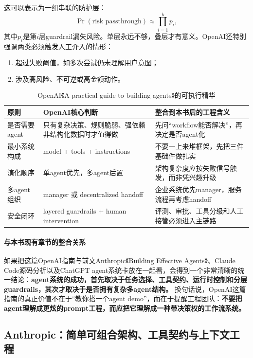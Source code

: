 \documentclass[12pt,a4paper]{article}
\begin{document}
这可以表示为一组串联的防护层：
\begin{equation}
\Pr(\text{risk passthrough}) \approx \prod_{i=1}^{k} p_i,
\end{equation}
其中$p_i$是第$i$层guardrail漏失风险。单层永远不够，叠层才有意义。OpenAI还特别强调两类必须触发人工介入的情形：
\begin{enumerate}
    \item 超过失败阈值，如多次尝试仍未理解用户意图；
    \item 涉及高风险、不可逆或高金额动作。
\end{enumerate}

\begin{table}[H]
\centering
\caption{OpenAI《A practical guide to building agents》的可执行精华}
\begin{tabular}{p{3.1cm}p{4.6cm}p{4.7cm}}
\toprule
\textbf{原则} & \textbf{OpenAI核心判断} & \textbf{整合到本书后的工程含义} \\
\midrule
是否需要agent & 只有复杂决策、规则脆弱、强依赖非结构化数据时才值得做 & 先问“workflow能否解决”，再决定是否agent化 \\
最小系统构成 & model + tools + instructions & 不要一上来堆框架，先把三件基础件做扎实 \\
演化顺序 & 单agent优先，多agent后置 & 架构复杂度应按失败信号触发，而非凭兴趣升级 \\
多agent组织 & manager 或 decentralized handoff & 企业系统优先manager，服务流程再考虑handoff \\
安全闭环 & layered guardrails + human intervention & 评测、审批、工具分级和人工接管必须进入主链路 \\
\bottomrule
\end{tabular}
\end{table}

\paragraph{与本书现有章节的整合关系}

如果把这篇OpenAI指南与前文Anthropic《Building Effective Agents》、Claude Code源码分析以及ChatGPT agent系统卡放在一起看，会得到一个非常清晰的统一结论：\textbf{agent系统的成功，首先取决于任务选择、工具契约、运行时控制和分层guardrails，其次才取决于是否拥有复杂多agent结构。} 换句话说，OpenAI这篇指南的真正价值不在于“教你搭一个agent demo”，而在于提醒工程团队：\textbf{不要把agent理解成更炫的prompt工程，而应把它理解成一种带决策权的工作流系统。}

\subsection{Anthropic：简单可组合架构、工具契约与上下文工程}
\end{document}
